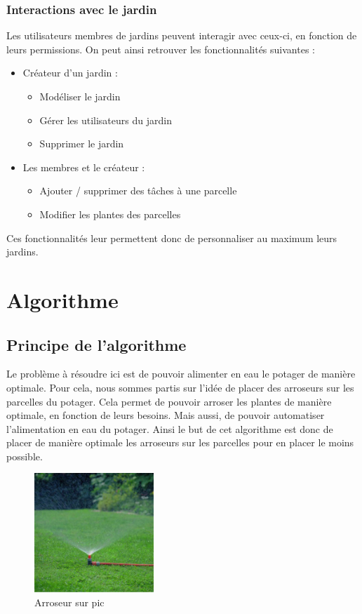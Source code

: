 \documentclass[french,a4paper]{article}
\begin{document}
\subsubsection{Interactions avec le jardin}
Les utilisateurs membres de jardins peuvent interagir avec ceux-ci, en fonction de leurs permissions. On peut ainsi retrouver les fonctionnalités suivantes :
\begin{itemize}
    \item Créateur d'un jardin :
          \begin{itemize}
              \item Modéliser le jardin
              \item Gérer les utilisateurs du jardin
              \item Supprimer le jardin
          \end{itemize}
    \item Les membres et le créateur :
          \begin{itemize}
              \item Ajouter / supprimer des tâches à une parcelle
              \item Modifier les plantes des parcelles
          \end{itemize}
\end{itemize}
Ces fonctionnalités leur permettent donc de personnaliser au maximum leurs jardins.
\newpage
\section{Algorithme}
\subsection{Principe de l'algorithme}
Le problème à résoudre ici est de pouvoir alimenter en eau le potager de manière optimale. Pour cela, nous sommes partis sur l'idée de placer des arroseurs sur les parcelles du potager.
Cela permet de pouvoir arroser les plantes de manière optimale, en fonction de leurs besoins. Mais aussi, de pouvoir automatiser l'alimentation en eau du potager.
Ainsi le but de cet algorithme est donc de placer de manière optimale les arroseurs sur les parcelles pour en placer le moins possible.
\begin{figure}[H]
    \centering
    \includegraphics[width=0.4\textwidth]{img/arroseur-sur-pic.jpg}
    \caption{Arroseur sur pic}
\end{figure}
\end{document}
